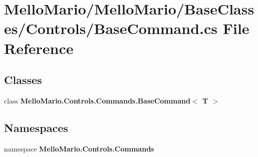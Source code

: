 \section{Mello\+Mario/\+Mello\+Mario/\+Base\+Classes/\+Controls/\+Base\+Command.cs File Reference}
\label{BaseCommand_8cs}
\subsection*{Classes}
\begin{DoxyCompactItemize}
\item 
class \textbf{ Mello\+Mario.\+Controls.\+Commands.\+Base\+Command$<$ T $>$}
\end{DoxyCompactItemize}
\subsection*{Namespaces}
\begin{DoxyCompactItemize}
\item 
namespace \textbf{ Mello\+Mario.\+Controls.\+Commands}
\end{DoxyCompactItemize}

